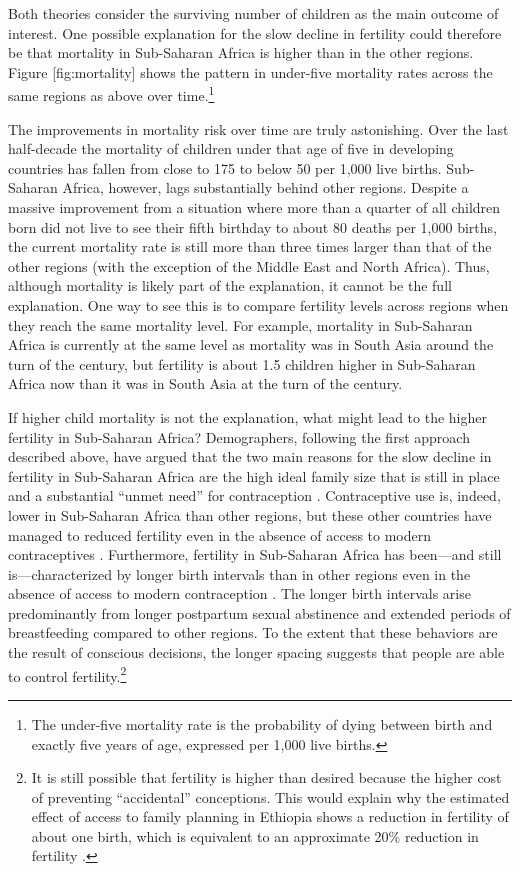 Both theories consider the surviving number of children as the main outcome of interest. One possible explanation for the slow decline in fertility could therefore be that mortality in Sub-Saharan Africa is higher than in the other regions. Figure {[}fig:mortality{]} shows the pattern in under-five mortality rates across the same regions as above over time.\footnote{The under-five mortality rate is the probability of dying between birth and exactly five years of age, expressed per 1,000 live births.}

The improvements in mortality risk over time are truly astonishing. Over the last half-decade the mortality of children under that age of five in developing countries has fallen from close to 175 to below 50 per 1,000 live births. Sub-Saharan Africa, however, lags substantially behind other regions. Despite a massive improvement from a situation where more than a quarter of all children born did not live to see their fifth birthday to about 80 deaths per 1,000 births, the current mortality rate is still more than three times larger than that of the other regions (with the exception of the Middle East and North Africa). Thus, although mortality is likely part of the explanation, it cannot be the full explanation. One way to see this is to compare fertility levels across regions when they reach the same mortality level. For example, mortality in Sub-Saharan Africa is currently at the same level as mortality was in South Asia around the turn of the century, but fertility is about 1.5 children higher in Sub-Saharan Africa now than it was in South Asia at the turn of the century.

If higher child mortality is not the explanation, what might lead to the higher fertility in Sub-Saharan Africa? Demographers, following the first approach described above, have argued that the two main reasons for the slow decline in fertility in Sub-Saharan Africa are the high ideal family size that is still in place and a substantial ``unmet need'' for contraception \citep{Bongaarts2013a,Casterline2017,Singh2017}. Contraceptive use is, indeed, lower in Sub-Saharan Africa than other regions, but these other countries have managed to reduced fertility even in the absence of access to modern contraceptives \citet{Schultz1985,Galloway1987,Bailey1998,bengtsson06}. Furthermore, fertility in Sub-Saharan Africa has been---and still is---characterized by longer birth intervals than in other regions even in the absence of access to modern contraception \citep{Caldwell1992,Moultrie2012,Casterline2016}. The longer birth intervals arise predominantly from longer postpartum sexual abstinence and extended periods of breastfeeding compared to other regions. To the extent that these behaviors are the result of conscious decisions, the longer spacing suggests that people are able to control fertility.\footnote{It is still possible that fertility is higher than desired because the higher cost of preventing ``accidental'' conceptions. This would explain why the estimated effect of access to family planning in Ethiopia shows a reduction in fertility of about one birth, which is equivalent to an approximate 20\% reduction in fertility \citep{Portner2014a}.}

